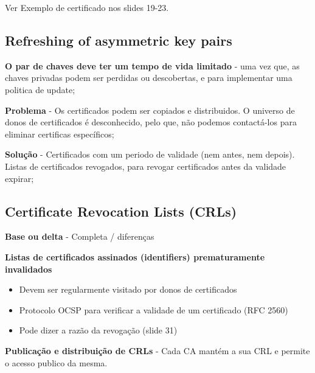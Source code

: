 \documentclass{article}
\begin{document}
Ver Exemplo de certificado nos slides 19-23.

\subsection{Refreshing of asymmetric key
pairs}

\begin{flushleft}
  \textbf{O par de chaves deve ter um tempo de vida limitado} - uma vez que,
  as chaves privadas podem ser perdidas ou descobertas, e para implementar
  uma politica de update;

  \vspace{2mm}

  \textbf{Problema} - Os certificados podem ser copiados e distribuidos.
  O universo de donos de certificados é desconhecido, pelo que, não podemos
  contactá-los para eliminar certificas específicos;

  \vspace{2mm}

  \textbf{Solução} - Certificados com um periodo de validade (nem antes, nem depois).
  Listas de certificados revogados, para revogar certificados
  antes da validade expirar;
\end{flushleft}

\subsection{Certificate Revocation Lists (CRLs)}

\begin{flushleft}
  \textbf{Base ou delta} - Completa / diferenças

  \vspace{2mm}

  \textbf{Listas de certificados assinados (identifiers) prematuramente
  invalidados} 
  \begin{itemize}
    \item Devem ser regularmente visitado por donos de certificados
    \item Protocolo OCSP para verificar a validade de um certificado (RFC 2560)
    \item Pode dizer a razão da revogação (slide 31)
  \end{itemize}

  \vspace{2mm}

  \textbf{Publicação e distribuição de CRLs} - Cada CA mantém
  a sua CRL e permite o acesso publico da mesma.
\end{flushleft}
\end{document}
